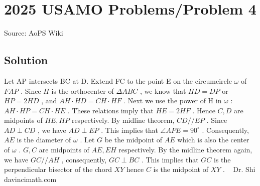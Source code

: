 \documentclass[12pt]{article}
\begin{document}
\section*{{2025 USAMO Problems/Problem 4}}
Source: AoPS Wiki

\subsection*{Solution}
Let AP intersects BC at D. Extend FC to the point E on the circumcircle $\omega$ of $FAP$ . Since $H$ is the orthocenter of $\Delta ABC$ , we know that $HD = DP$ or $HP = 2HD$ , and $AH \cdot HD = CH \cdot HF$ . Next we use the power of H in $\omega$ : $AH \cdot HP = CH \cdot HE$ . These relations imply that $HE = 2HF$ . Hence $C, D$ are midpoints of $HE, HP$ respectively. By midline theorem, $CD // EP$ . Since $AD \perp CD$ , we have $AD \perp EP$ . This implies that $\angle APE = 90^{\circ}$ . Consequently, $AE$ is the diameter of $\omega$ . Let $G$ be the midpoint of $AE$ which is also the center of $\omega$ . $G,C$ are midpoints of $AE, EH$ respectively. By the midline theorem again, we have $GC//AH$ , consequently, $GC \perp BC$ . This implies that $GC$ is the perpendicular bisector of the chord $XY$ hence $C$ is the midpoint of $XY$ . ~ Dr. Shi davincimath.com
\end{document}
